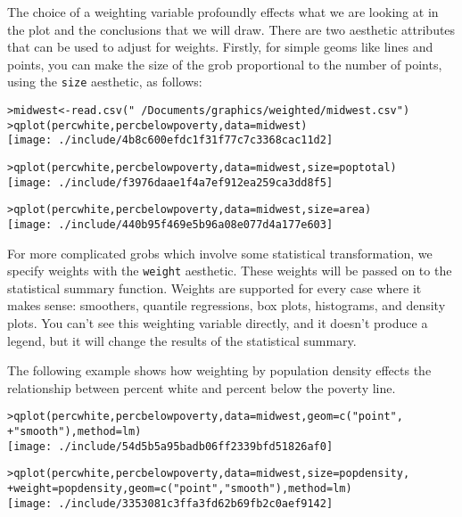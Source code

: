 \noindent The choice of a weighting variable profoundly effects what we are looking at in the plot and the conclusions that we will draw.  There are two aesthetic attributes that can be used to adjust for weights.  Firstly, for simple geoms like lines and points, you can make the size of the grob proportional to the number of points, using the {\tt size} aesthetic, as follows:

\begin{alltt}
> midwest <- read.csv("~/Documents/graphics/weighted/midwest.csv")
> qplot(percwhite, percbelowpoverty, data = midwest)
\texttt{[image: ./include/4b8c600efdc1f31f77c7c3368cac11d2]}

> qplot(percwhite, percbelowpoverty, data = midwest, size = poptotal)
\texttt{[image: ./include/f3976daae1f4a7ef912ea259ca3dd8f5]}

> qplot(percwhite, percbelowpoverty, data = midwest, size = area)
\texttt{[image: ./include/440b95f469e5b96a08e077d4a177e603]}

\end{alltt}

For more complicated grobs which involve some statistical transformation, we specify weights with the {\tt weight} aesthetic.  These weights will be passed on to the statistical summary function.  Weights are supported for every case where it makes sense: smoothers, quantile regressions, box plots, histograms, and density plots.  You can't see this weighting variable directly, and it doesn't produce a legend, but it will change the results of the statistical summary.

The following example shows how weighting by population density effects the relationship between percent white and percent below the poverty line.

\begin{alltt}
> qplot(percwhite, percbelowpoverty, data = midwest, geom = c("point", 
+     "smooth"), method = lm)
\texttt{[image: ./include/54d5b5a95badb06ff2339bfd51826af0]}

> qplot(percwhite, percbelowpoverty, data = midwest, size = popdensity, 
+     weight = popdensity, geom = c("point", "smooth"), method = lm)
\texttt{[image: ./include/3353081c3ffa3fd62b69fb2c0aef9142]}

\end{alltt}

